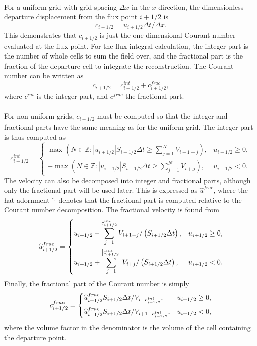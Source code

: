 \documentclass[11pt,a4paper]{article}
\begin{document}
\\
For a uniform grid with grid spacing $\Delta x$ in the $x$ direction, the dimensionless departure displacement from the flux point $i+1/2$ is
\begin{equation}
c_{i+1/2} = u_{i+1/2} \Delta{t} / \Delta{x}.
\end{equation}
This demonstrates that $c_{i+1/2}$ is just the one-dimensional Courant number evaluated at the flux point.
For the flux integral calculation, the integer part is the number of whole cells to sum the field over, and the fractional part is the fraction of the departure cell to integrate the reconstruction. The Courant number can be written as
\begin{equation}
c_{i+1/2} = c^{int}_{i+1/2} + c^{frac}_{i+1/2},
\end{equation}
where $c^{int}$ is the integer part, and $c^{frac}$ the fractional part. \\
\\
For non-uniform grids, $c_{i+1/2}$ must be computed so that the integer and fractional parts have the same meaning as for the uniform grid.
The integer part is thus computed as
\begin{equation} \label{eqn:int_courant}
c^{int}_{i+1/2} = 
\begin{cases}
\max\left(N\in\mathbb{Z} : |u_{i+1/2}| S_{i+1/2}\Delta t \geq\sum_{j=1}^N V_{i+1-j} \right), & u_{i+1/2} \geq 0, \\
-\max\left(N\in\mathbb{Z} : |u_{i+1/2}| S_{i+1/2} \Delta t \geq\sum_{j=1}^N V_{i+j} \right), & u_{i+1/2} < 0.
\end{cases}
\end{equation}
The velocity can also be decomposed into integer and fractional parts, although only the fractional part will be used later.
This is expressed as $\widehat{u}^{frac}$, where the hat adornment $\widehat{\cdot}$ denotes that the fractional part is computed relative to the Courant number decomposition.
The fractional velocity is found from
\begin{equation} \label{eqn:frac_wind}
\widehat{u}^{frac}_{i+1/2} = 
\begin{dcases}
u_{i+1/2}-\sum_{j=1}^{c^{int}_{i+1/2}} V_{i+1-j} / \left(S_{i+1/2}\Delta t\right), & u_{i+1/2} \geq 0, \\
u_{i+1/2}+\sum_{j=1}^{\left|c^{int}_{i+1/2}\right|} V_{i+j} / \left(S_{i+1/2}\Delta t\right), & u_{i+1/2} < 0.
\end{dcases}
\end{equation}
Finally, the fractional part of the Courant number is simply
\begin{equation} \label{eqn:frac_courant}
c^{frac}_{i+1/2} =
\begin{dcases}
\widehat{u}^{frac}_{i+1/2} S_{i+1/2}\Delta t / V_{i-c^{int}_{i+1/2}}, & u_{i+1/2} \geq 0, \\
\widehat{u}^{frac}_{i+1/2} S_{i+1/2}\Delta t / V_{i+1-c^{int}_{i+1/2}}, & u_{i+1/2} < 0,
\end{dcases}
\end{equation}
where the volume factor in the denominator is the volume of the cell containing the departure point.
\end{document}
